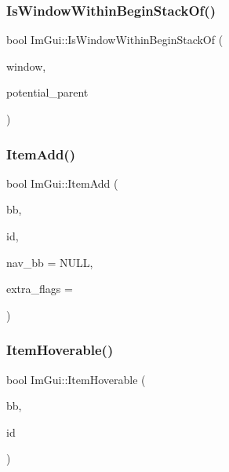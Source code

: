 \subsubsection{\texorpdfstring{Is\+Window\+Within\+Begin\+Stack\+Of()}{IsWindowWithinBeginStackOf()}}
{\footnotesize\ttfamily bool Im\+Gui\+::\+Is\+Window\+Within\+Begin\+Stack\+Of (\begin{DoxyParamCaption}\item[{\hyperlink{structImGuiWindow}{Im\+Gui\+Window} $\ast$}]{window,  }\item[{\hyperlink{structImGuiWindow}{Im\+Gui\+Window} $\ast$}]{potential\+\_\+parent }\end{DoxyParamCaption})}

\mbox{\label{namespaceImGui_a5de8ecd4c80efdca1af7329a2a48121c}} 
\subsubsection{\texorpdfstring{Item\+Add()}{ItemAdd()}}
{\footnotesize\ttfamily bool Im\+Gui\+::\+Item\+Add (\begin{DoxyParamCaption}\item[{const \hyperlink{structImRect}{Im\+Rect} \&}]{bb,  }\item[{Im\+Gui\+ID}]{id,  }\item[{const \hyperlink{structImRect}{Im\+Rect} $\ast$}]{nav\+\_\+bb = {\ttfamily NULL},  }\item[{\hyperlink{imgui__internal_8h_abcf9eafab4557e911b2c0d8fe2feeb38}{Im\+Gui\+Item\+Flags}}]{extra\+\_\+flags = {} }\end{DoxyParamCaption})}

\mbox{\label{namespaceImGui_a488b86a9f235923304186fb86ff64ffb}} 
\subsubsection{\texorpdfstring{Item\+Hoverable()}{ItemHoverable()}}
{\footnotesize\ttfamily bool Im\+Gui\+::\+Item\+Hoverable (\begin{DoxyParamCaption}\item[{const \hyperlink{structImRect}{Im\+Rect} \&}]{bb,  }\item[{Im\+Gui\+ID}]{id }\end{DoxyParamCaption})}


